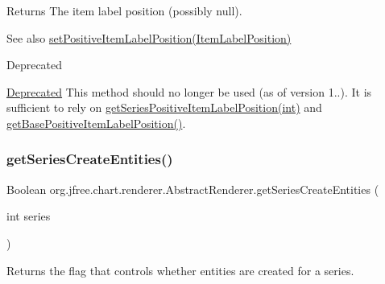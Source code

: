 \begin{DoxyReturn}{Returns}
The item label position (possibly {\ttfamily null}).
\end{DoxyReturn}
\begin{DoxySeeAlso}{See also}
\mbox{\hyperlink{classorg_1_1jfree_1_1chart_1_1renderer_1_1_abstract_renderer_ad292484a8924e35756b3fb423fdd4ccc}{set\+Positive\+Item\+Label\+Position(\+Item\+Label\+Position)}}
\end{DoxySeeAlso}
\begin{DoxyRefDesc}{Deprecated}
\item[\mbox{\hyperlink{deprecated__deprecated000137}{Deprecated}}]This method should no longer be used (as of version 1..). It is sufficient to rely on \mbox{\hyperlink{classorg_1_1jfree_1_1chart_1_1renderer_1_1_abstract_renderer_aeeec0341e079d624ac0a0984fbe83ceb}{get\+Series\+Positive\+Item\+Label\+Position(int)}} and \mbox{\hyperlink{classorg_1_1jfree_1_1chart_1_1renderer_1_1_abstract_renderer_ab6f209ffdfae7e859ba7c047f3160630}{get\+Base\+Positive\+Item\+Label\+Position()}}. \end{DoxyRefDesc}
\mbox{\label{classorg_1_1jfree_1_1chart_1_1renderer_1_1_abstract_renderer_ab00f0025b38b9114f5fb3fded82628e7}} 
\subsubsection{\texorpdfstring{get\+Series\+Create\+Entities()}{getSeriesCreateEntities()}}
{\footnotesize\ttfamily Boolean org.\+jfree.\+chart.\+renderer.\+Abstract\+Renderer.\+get\+Series\+Create\+Entities (\begin{DoxyParamCaption}\item[{int}]{series }\end{DoxyParamCaption})}

Returns the flag that controls whether entities are created for a series.


